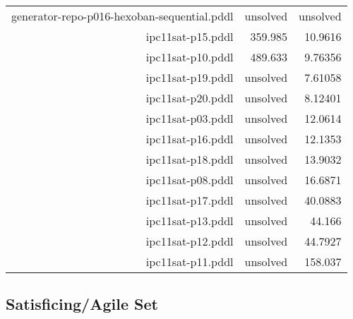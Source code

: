 \documentclass{article}
\begin{document}
\begin{center}
\begin{tabular}{r|r|r}
 generator-repo-p016-hexoban-sequential.pddl&unsolved&unsolved\\
 ipc11sat-p15.pddl&359.985&10.9616\\
 ipc11sat-p10.pddl&489.633&9.76356\\
 ipc11sat-p19.pddl&unsolved&7.61058\\
 ipc11sat-p20.pddl&unsolved&8.12401\\
 ipc11sat-p03.pddl&unsolved&12.0614\\
 ipc11sat-p16.pddl&unsolved&12.1353\\
 ipc11sat-p18.pddl&unsolved&13.9032\\
 ipc11sat-p08.pddl&unsolved&16.6871\\
 ipc11sat-p17.pddl&unsolved&40.0883\\
 ipc11sat-p13.pddl&unsolved&44.166\\
 ipc11sat-p12.pddl&unsolved&44.7927\\
 ipc11sat-p11.pddl&unsolved&158.037
                            \end{tabular}
                            \end{center}
                    

                    \subsection*{Satisficing/Agile Set}
                    
\end{document}
